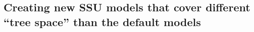 \subsection{Creating new SSU models that cover
  different ``tree space'' than the default models}

